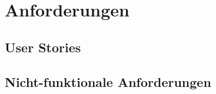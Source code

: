 \chapter{Anforderungen}

\xxx

\section{User Stories}\label{sec:pd:user-stories}

\xxx

\section{Nicht-funktionale Anforderungen}

\xxx
